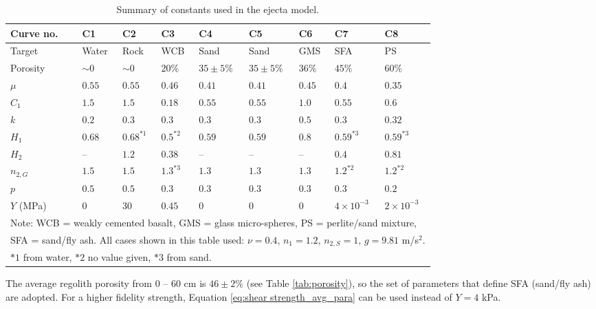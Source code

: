 \documentclass{article}
\begin{document}
\begin{table}[!htb]
	\begin{center}
		\caption{Summary of constants used in the \cite{housen2011ejecta} ejecta model.}
		\label{tab:scaling law parameters}
		\begin{tabular}{l l l l l l l l l}
			\hline
			Curve no.\ & C1    & C2   & C3  & C4   & C5   & C6  & C7  & C8  \\
			\hline
			Target     & Water & Rock & WCB & Sand & Sand & GMS & SFA & PS\\
			Porosity   & $\sim 0$ & $\sim 0$ & $20\%$ & $35\pm 5\%$ & $35\pm 5\%$ & $36\%$ & $45\%$ & $60\%$\\
			$\mu$ & $0.55$ & $0.55$ & $0.46$ & $0.41$ & $0.41$ & $0.45$ & $0.4$ & $0.35$\\
			$C_1$ & $1.5$ & $1.5$ & $0.18$ & $0.55$ & $0.55$ & $1.0$ & $0.55$ & $0.6$ \\
			$k$ & $0.2$ & $0.3$ & $0.3$ & $0.3$ & $0.3$ & $0.5$ & $0.3$ & $0.32$\\ 
			$H_1$ & $0.68$ & $0.68^{*1}$ & $0.5^{*2}$ & $0.59$ & $0.59$ & $0.8$ & $0.59^{*3}$ & $0.59^{*3}$\\
			$H_2$ & -- & $1.2$ & $0.38$ & -- & -- & -- & $0.4$ & $0.81$\\
			$n_{2,G}$ & $1.5$ & $1.5$ & $1.3^{*3}$ & $1.3$ & $1.3$ & $1.3$ & $1.2^{*2}$ & $1.2^{*2}$\\
			$p$ & $0.5$ & $0.5$ & $0.3$ & $0.3$ & $0.3$ & $0.3$ & $0.3$ & $0.2$\\
			$Y$ (MPa) & $0$ & $30$ & $0.45$ & $0$ & $0$ & $0$ & $4\times 10^{-3}$ & $2\times 10^{-3}$\\
			\hline
			\multicolumn{9}{l}{\footnotesize Note: WCB = weakly cemented basalt, GMS = glass micro-spheres, PS = perlite/sand mixture,} \\
			\multicolumn{9}{l}{\footnotesize SFA = sand/fly ash. All cases shown in this table used: $\nu=0.4$, $n_1=1.2$, $n_{2,S} = 1$, $g=9.81$ m/s$^2$.} \\
			\multicolumn{9}{l}{\footnotesize $*1$ from water, $*2$ no value given, $*3$ from sand.}\\
			 
		\end{tabular}
	\end{center}
\end{table}

The average regolith porosity from $0$ -- $60$ cm is $46\pm 2 \%$ (see Table \ref{tab:porosity}), so the set of parameters that define SFA (sand/fly ash) are adopted. For a higher fidelity strength, Equation \eqref{eq:shear strength_avg_para} can be used instead of $Y = 4$ kPa.
\end{document}
